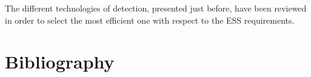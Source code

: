 \begin{refsection}
  The different technologies of detection, presented just before, have been reviewed in order to select the most efficient one with respect to the ESS requirements. 

  

  \cleardoublepage
  \section*{Bibliography}
  \label{ch2:bib}
  \printbibliography[heading=subbibliography]

\end{refsection}